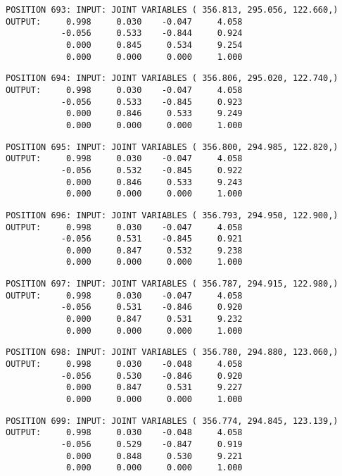 \begin{verbatim}
POSITION 693: INPUT: JOINT VARIABLES ( 356.813, 295.056, 122.660,)
OUTPUT:     0.998     0.030    -0.047     4.058
           -0.056     0.533    -0.844     0.924
            0.000     0.845     0.534     9.254
            0.000     0.000     0.000     1.000
\end{verbatim} \pagebreak[1]\begin{verbatim}
POSITION 694: INPUT: JOINT VARIABLES ( 356.806, 295.020, 122.740,)
OUTPUT:     0.998     0.030    -0.047     4.058
           -0.056     0.533    -0.845     0.923
            0.000     0.846     0.533     9.249
            0.000     0.000     0.000     1.000
\end{verbatim} \pagebreak[1]\begin{verbatim}
POSITION 695: INPUT: JOINT VARIABLES ( 356.800, 294.985, 122.820,)
OUTPUT:     0.998     0.030    -0.047     4.058
           -0.056     0.532    -0.845     0.922
            0.000     0.846     0.533     9.243
            0.000     0.000     0.000     1.000
\end{verbatim} \pagebreak[1]\begin{verbatim}
POSITION 696: INPUT: JOINT VARIABLES ( 356.793, 294.950, 122.900,)
OUTPUT:     0.998     0.030    -0.047     4.058
           -0.056     0.531    -0.845     0.921
            0.000     0.847     0.532     9.238
            0.000     0.000     0.000     1.000
\end{verbatim} \pagebreak[1]\begin{verbatim}
POSITION 697: INPUT: JOINT VARIABLES ( 356.787, 294.915, 122.980,)
OUTPUT:     0.998     0.030    -0.047     4.058
           -0.056     0.531    -0.846     0.920
            0.000     0.847     0.531     9.232
            0.000     0.000     0.000     1.000
\end{verbatim} \pagebreak[1]\begin{verbatim}
POSITION 698: INPUT: JOINT VARIABLES ( 356.780, 294.880, 123.060,)
OUTPUT:     0.998     0.030    -0.048     4.058
           -0.056     0.530    -0.846     0.920
            0.000     0.847     0.531     9.227
            0.000     0.000     0.000     1.000
\end{verbatim} \pagebreak[1]\begin{verbatim}
POSITION 699: INPUT: JOINT VARIABLES ( 356.774, 294.845, 123.139,)
OUTPUT:     0.998     0.030    -0.048     4.058
           -0.056     0.529    -0.847     0.919
            0.000     0.848     0.530     9.221
            0.000     0.000     0.000     1.000
\end{verbatim} \pagebreak[1]\begin{verbatim}

\end{verbatim}

